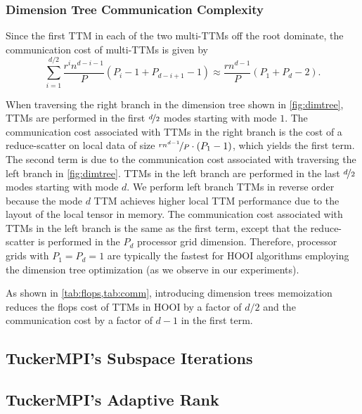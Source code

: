     \subsubsection{Dimension Tree Communication Complexity}

        Since the first TTM in each of the two multi-TTMs off the root dominate,
        the communication cost of multi-TTMs is given by
        \begin{equation*}
            \sum_{i=1}^{d/2}  \frac{r^in^{d-i-1}}{P}\left(P_i - 1 + P_{d-i+1} - 1\right) \approx   \frac{rn^{d-1}}{P} \left(P_1 + P_d - 2\right).
        \end{equation*}
        
        When traversing the right branch in the dimension tree shown in
        \cref{fig:dimtree}, TTMs are performed in the first $\nicefrac d2$ modes
        starting with mode $1$. The communication cost associated with TTMs in
        the right branch is the cost of a reduce-scatter on local data of size
        $\nicefrac{rn^{d-1}}{P}\cdot(P_1-1)$, which yields the first term. The
        second term is due to the communication cost associated with traversing
        the left branch in \cref{fig:dimtree}. TTMs in the left branch are
        performed in the last $\nicefrac d2$ modes starting with mode $d$. We
        perform left branch TTMs in reverse order because the mode $d$ TTM
        achieves higher local TTM performance due to the layout of the local
        tensor in memory. The communication cost associated with TTMs in the
        left branch is the same as the first term, except that the
        reduce-scatter is performed in the $P_d$ processor grid dimension.
        Therefore, processor grids with $P_1 = P_d = 1$ are typically the
        fastest for HOOI algorithms employing the dimension tree optimization
        (as we observe in our experiments).

        As shown in \cref{tab:flops,tab:comm}, introducing dimension trees
        memoization reduces the flops cost of TTMs in HOOI by a factor of $d/2$
        and the communication cost by a factor of $d-1$ in the first term.


\subsection{TuckerMPI's Subspace Iterations}

\subsection{TuckerMPI's Adaptive Rank}
